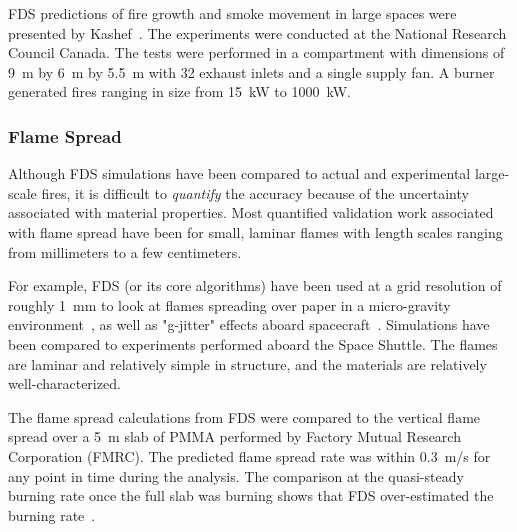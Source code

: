FDS predictions of fire growth and smoke movement in large spaces were presented by  Kashef~\cite{Kashef:1}.  The experiments  were conducted at the
National Research Council  Canada.  The tests were performed in a compartment with  dimensions of 9~m by 6~m by  5.5~m with 32 exhaust inlets and a
single supply fan.  A burner  generated fires ranging in size  from 15~kW  to 1000~kW.


\subsubsection{Flame Spread}
\label{flame spread}

Although FDS simulations have been compared to actual and experimental large-scale fires, it is difficult to {\em quantify} the accuracy because of
the uncertainty associated with material properties. Most quantified validation work associated with flame spread have been for small, laminar flames with
length scales ranging from millimeters to a few centimeters.

For example, FDS (or its core algorithms) have been
used at a grid resolution of roughly 1~mm to look at flames spreading over paper in a micro-gravity
environment~\cite{McGrattan:C&F1996,Kashiwagi:CS1996,Mell:CS98,Mell:CS00,Prasad:CS2002,Nakamura:C&F2002},
as well as "g-jitter" effects aboard spacecraft~\cite{Mell:g-jitter}.
Simulations have been compared to experiments performed aboard the
Space Shuttle.  The flames are laminar and relatively simple in
structure, and the materials are relatively well-characterized.

The flame spread  calculations from FDS were compared  to the vertical flame  spread over  a 5~m  slab of  PMMA performed  by  Factory Mutual
Research  Corporation (FMRC).   The  predicted flame  spread rate  was within  0.3~m/s  for any  point  in  time  during the  analysis.   The
comparison at  the quasi-steady  burning rate once  the full  slab was burning     shows    that     FDS    over-estimated     the    burning
rate~\cite{Ma:2,Ma:3}.

